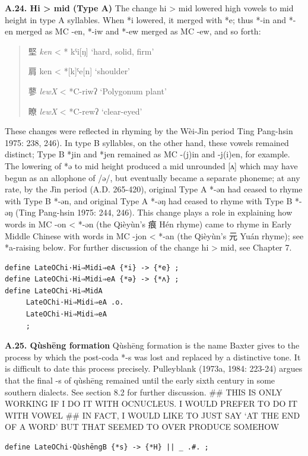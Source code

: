 \documentclass[xetex, svgnames, 12pt]{scrartcl}
\newcounter{para}
\newcommand\mypara[1]{\par\refstepcounter{para}\textbf{\thepara\space#1\space}}
\begin{document}
\mypara{A.24. Hi > mid (Type A)}
 The change hi > mid lowered high vowels to mid height in type A syllables.
 When *i lowered, it merged with *e; thus *-in and *-en merged as MC -en, *-iw and *-ew
 merged as MC -ew, and so forth:
 \begin{quote}
 堅 %
 \textit{ken} < * kˤi[ŋ] `hard, solid, firm'

 肩 %
 ken < *[k]ˤe[n] `shoulder'

 蓼 %
 \textit{lewX} < *C-riwʔ `Polygonum plant'

 瞭 %
 \textit{lewX} < *C-rewʔ `clear-eyed'
 \end{quote}
 These changes were reflected in rhyming by the Wèi-Jìn period Ting Pang-hsin 1975: 238,
 246). In type B syllables, on the other hand, these vowels remained distinct; Type B *jin
 and *jen remained as MC -(j)in and -j(i)en, for example.
 The lowering of *ə to mid height produced a mid unrounded [ʌ] which may have begun as
 an allophone of /ə/, but eventually became a separate phoneme; at any rate, by the Jìn period
 (A.D. 265-420), original Type A *-ən had ceased to rhyme with Type B *-ən, 
 and original Type A *-əŋ had ceased
 to rhyme with Type B *-əŋ (Ting Pang-hsin 1975: 244, 246). This change plays a role in
 explaining how words in MC -on < *-ən (the Qièyùn's 痕 Hén rhyme) came to rhyme in
 Early Middle Chinese with words in MC -jon < *-an (the Qièyùn's 元 Yuán rhyme); see
 *a-raising below. For further discussion of the change hi > mid, see Chapter 7.
\begin{verbatim}
define LateOChi·Hi⇒Midi⇒eA {*i} -> {*e} ; 
define LateOChi·Hi⇒Midi⇒eA {*ə} -> {*ʌ} ; 
define LateOChi·Hi⇒MidA
     LateOChi·Hi⇒Midi⇒eA .o.
     LateOChi·Hi⇒Midi⇒eA 
     ; 
\end{verbatim} 

\mypara{A.25. Qùshēng formation}
 Qùshēng formation is the name Baxter gives to the process by which the post-coda *-s was lost
 and replaced by a distinctive tone. It is difficult to date this process precisely. Pulleyblank
 (1973a, 1984: 223-24) argues that the final -s of qùshēng remained until the early sixth
 century in some southern dialects. See section 8.2 for further discussion.
## THIS IS ONLY WORKING IF I DO IT WITH OCNUCLEUS. I WOULD PREFER TO DO IT WITH VOWEL
## IN FACT, I WOULD LIKE TO JUST SAY `AT THE END OF A WORD' BUT THAT SEEMED TO OVER PRODUCE SOMEHOW
\begin{verbatim}
define LateOChi·QùshēngB {*s} -> {*H} || _ .#. ;
\end{verbatim}
\end{document}
